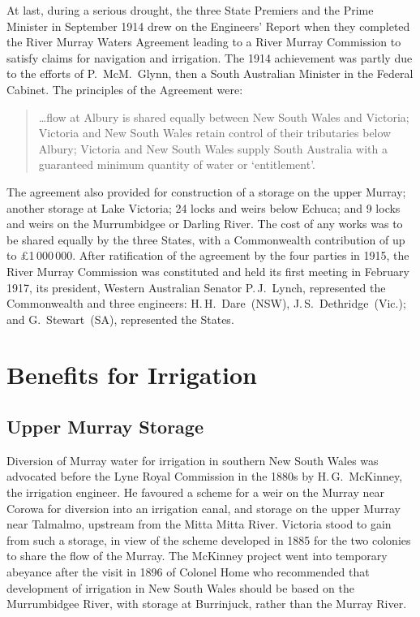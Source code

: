 At last, during a serious drought, the three State Premiers and the
Prime Minister in September 1914 drew on the Engineers' Report when
they completed the River Murray Waters Agreement leading to a River
Murray Commission to satisfy claims for navigation and irrigation. The
1914 achievement was partly due to the efforts of P.~McM.~Glynn, then
a South Australian Minister in the Federal Cabinet. The principles of the Agreement were:
\begin{quote}
	\ldots flow at Albury is shared equally between New South
	Wales and Victoria; Victoria and New South Wales retain
	control of their tributaries below Albury; Victoria and New
	South Wales supply South Australia with a guaranteed minimum
	quantity of water or `entitlement'.
\end{quote}

The agreement also provided for construction of a storage on the upper
Murray; another storage at Lake Victoria; 24 locks and weirs below
Echuca; and 9 locks and weirs on the Murrumbidgee or Darling River.
The cost of any works was to be shared equally by the three States,
with a Commonwealth contribution of up to \pounds1\,000\,000. After
ratification of the agreement by the four parties in 1915, the River
Murray Commission was constituted and held its first meeting in
February 1917, its president, Western Australian Senator P.\,J.~Lynch,
represented the Commonwealth and three engineers: H.\,H.~Dare~(NSW),
J.\,S.~Dethridge~(Vic.); and G.~Stewart~(SA), represented the
States.

\section*{Benefits for Irrigation}

\subsection*{Upper Murray Storage}

Diversion of Murray water for irrigation in southern New South Wales
was advocated before the Lyne Royal Commission in the 1880s by
H.\,G.~McKinney, the irrigation engineer.  He favoured a scheme for a
weir on the Murray near Corowa for diversion into an irrigation canal,
and storage on the upper Murray near Talmalmo, upstream from the Mitta
Mitta River.  Victoria stood to gain from such a storage, in view of
the scheme developed in 1885 for the two colonies to share the flow of
the Murray.  The McKinney project went into temporary abeyance after
the visit in 1896 of Colonel Home who recommended that development of
irrigation in New South Wales should be based on the Murrumbidgee
River, with storage at Burrinjuck, rather than the Murray
River.

